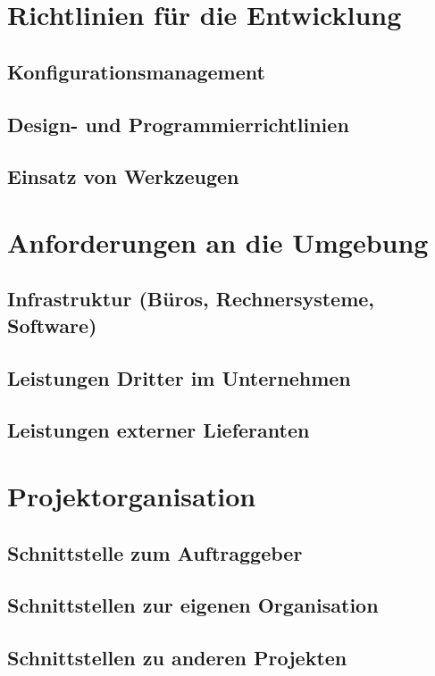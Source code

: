 \documentclass[a4paper,10pt]{scrartcl}
\begin{document}
\section{Richtlinien für die Entwicklung}
\subsection{Konfigurationsmanagement}
\subsection{Design- und Programmierrichtlinien}
\subsection{Einsatz von Werkzeugen}



\section{Anforderungen an die Umgebung}
\subsection{Infrastruktur (Büros, Rechnersysteme, Software)}
\subsection{Leistungen Dritter im Unternehmen}
\subsection{Leistungen externer Lieferanten}




\section{Projektorganisation}
\subsection{Schnittstelle zum Auftraggeber}
\subsection{Schnittstellen zur eigenen Organisation}
\subsection{Schnittstellen zu anderen Projekten}
\end{document}
